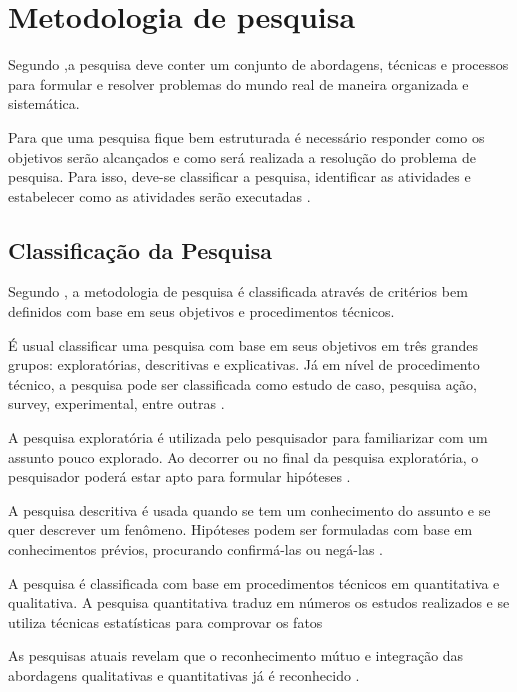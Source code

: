 \chapter{Metodologia de pesquisa}

Segundo ,a pesquisa deve conter um conjunto de abordagens, técnicas e processos para formular e resolver problemas do mundo real de maneira organizada e sistemática.

Para que uma pesquisa fique bem estruturada é necessário responder como os objetivos serão alcançados e  como será realizada a resolução do problema de pesquisa. Para isso, deve-se classificar a pesquisa, identificar as atividades e estabelecer como as atividades serão executadas \cite{forcon2014}.

\section{Classificação da Pesquisa}

Segundo , a metodologia de pesquisa é classificada através de critérios bem definidos com base em seus objetivos e procedimentos técnicos.

É usual classificar uma pesquisa com base em seus objetivos em três grandes grupos: exploratórias, descritivas e explicativas. Já em nível de procedimento técnico, a pesquisa pode ser classificada como estudo de caso, pesquisa ação, survey, experimental, entre outras .

A pesquisa exploratória é utilizada pelo pesquisador para familiarizar com um assunto pouco explorado. Ao decorrer ou no final da pesquisa exploratória, o pesquisador poderá estar apto para formular hipóteses \cite{giudice}.

A pesquisa descritiva é usada quando se tem um conhecimento do assunto e se quer descrever um fenômeno. Hipóteses podem ser formuladas com base em conhecimentos prévios, procurando confirmá-las ou negá-las \cite[pág.~21]{fonseca2002}.

A pesquisa é classificada com base em procedimentos técnicos em quantitativa e qualitativa. A pesquisa quantitativa traduz em números os estudos realizados e se utiliza técnicas estatísticas para comprovar os fatos \cite[pág.~9]{rodrigues2007}


As pesquisas atuais revelam que o reconhecimento mútuo e integração das abordagens qualitativas e quantitativas já é reconhecido \cite{serapioni}.

